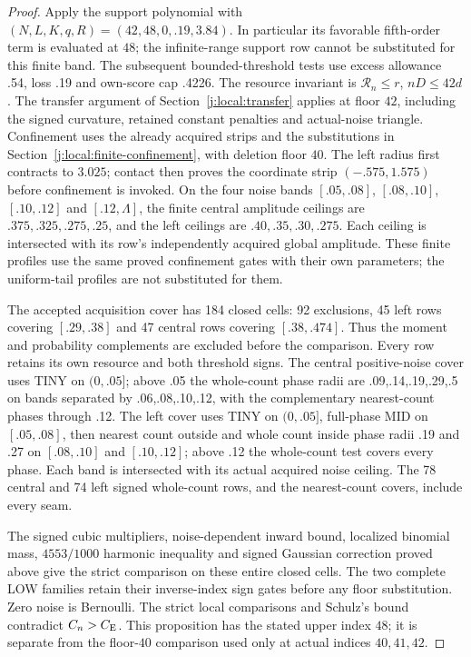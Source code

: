 \begin{proof}
Apply the support polynomial with $(N,L,K,q,R)=(42,48,0,.19,3.84)$.
In particular its favorable fifth-order term is evaluated at $48$; the
infinite-range support row cannot be substituted for this finite band.
The subsequent bounded-threshold tests use excess allowance .54, loss .19
and own-score cap .4226. The resource invariant is
$\mathcal R_n\le r$, $nD\le42d$. The transfer argument of
Section~\ref{j:local:transfer} applies at floor $42$, including the signed
curvature, retained constant penalties and actual-noise triangle.
Confinement uses the already acquired strips and the substitutions in
Section~\ref{j:local:finite-confinement}, with deletion floor $40$.
The left radius first contracts to $3.025$; contact then proves the
coordinate strip $(-.575,1.575)$ before confinement is invoked.
On the four noise bands $[.05,.08]$, $[.08,.10]$, $[.10,.12]$ and
$[.12,\Lambda]$, the finite central amplitude ceilings are
$.375,.325,.275,.25$, and the left ceilings are $.40,.35,.30,.275$.
Each ceiling is intersected with its row's independently acquired
global amplitude. These finite profiles use the same proved
confinement gates with their own parameters; the uniform-tail profiles
are not substituted for them.

The accepted acquisition cover has 184 closed cells: 92 exclusions,
45 left rows covering $[.29,.38]$ and 47 central rows covering
$[.38,.474]$. Thus the moment and probability complements are excluded
before the comparison. Every row retains its own resource and both
threshold signs. The central positive-noise cover uses TINY on $(0,.05]$;
above .05 the whole-count phase radii are .09,.14,.19,.29,.5 on bands
separated by .06,.08,.10,.12, with the complementary nearest-count
phases through .12. The left cover uses TINY on $(0,.05]$, full-phase
MID on $[.05,.08]$, then nearest count outside and whole count inside
phase radii .19 and .27 on $[.08,.10]$ and $[.10,.12]$; above .12 the
whole-count test covers every phase. Each band is intersected with its
actual acquired noise ceiling. The 78 central and 74 left signed
whole-count rows, and the nearest-count covers, include every seam.

The signed cubic multipliers, noise-dependent inward bound, localized
binomial mass, $4553/1000$ harmonic inequality and signed Gaussian
correction proved above give the strict comparison on these entire
closed cells. The two complete LOW families retain their inverse-index
sign gates before any floor substitution. Zero noise is Bernoulli.
The strict local comparisons and Schulz's bound contradict $C_n>C_{\mathrm E}$.
This proposition has the stated upper index $48$; it is separate from the
floor-$40$ comparison used only at actual indices $40,41,42$.
\end{proof}

